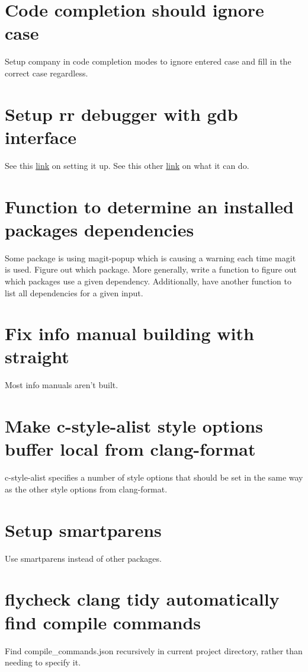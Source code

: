 \documentclass{default}
\begin{document}
\section{Code completion should ignore case}

Setup company in code completion modes to ignore entered case and fill in the correct case
regardless.

\section{Setup rr debugger with gdb interface}

See this
\href{https://emacs.stackexchange.com/questions/20056/is-it-possible-to-use-mozillas-rr-with-gdb-multi-window?rq=1}{link}
on setting it up. See this other
\href{http://fitzgeraldnick.com/2015/11/02/back-to-the-futurre.html}{link} on what it can do.

\section{Function to determine an installed packages dependencies}

Some package is using magit-popup which is causing a warning each time magit is used. Figure out
which package. More generally, write a function to figure out which packages use a given
dependency. Additionally, have another function to list all dependencies for a given input.

\section{Fix info manual building with straight}

Most info manuals aren't built.

\section{Make c-style-alist style options buffer local from clang-format}

c-style-alist specifies a number of style options that should be set in the same way as the other
style options from clang-format.

\section{Setup smartparens}

Use smartparens instead of other packages.

\section{flycheck clang tidy automatically find compile commands}

Find compile\_commands.json recursively in current project directory, rather than needing to specify
it.
\end{document}

